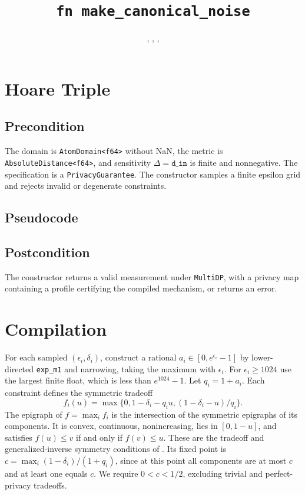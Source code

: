 \documentclass{article}
\title{\texttt{fn make\_canonical\_noise}}
\author{\AishwaryaRamasethuAuthor, \YuJuKuAuthor, \JordanAwanAuthor, \MichaelShoemateAuthor}
\begin{document}
\maketitle
\contrib

\section{Hoare Triple}
\subsection*{Precondition}
The domain is \texttt{AtomDomain<f64>} without NaN, the metric is
\texttt{AbsoluteDistance<f64>}, and sensitivity $\Delta=\texttt{d\_in}$
is finite and nonnegative. The specification is a \texttt{PrivacyGuarantee}.
The constructor samples a finite epsilon grid and rejects invalid or
degenerate constraints.

\subsection*{Pseudocode}


\subsection*{Postcondition}
\begin{theorem}
The constructor returns a valid measurement under \texttt{MultiDP}, with
a privacy map containing a profile certifying the compiled mechanism,
or returns an error.
\end{theorem}

\section{Compilation}
For each sampled $(\epsilon_i,\delta_i)$, construct a rational
$a_i\in[0,e^{\epsilon_i}-1]$ by lower-directed \texttt{exp\_m1} and
narrowing, taking the maximum with $\epsilon_i$. For $\epsilon_i\geq1024$
use the largest finite float, which is less than $e^{1024}-1$.
Let $q_i=1+a_i$. Each constraint defines the symmetric tradeoff
\[
 f_i(u)=\max\{0,1-\delta_i-q_i u,(1-\delta_i-u)/q_i\}.
\]
The epigraph of $f=\max_i f_i$ is the intersection of the symmetric
epigraphs of its components. It is convex, continuous, nonincreasing,
lies in $[0,1-u]$, and satisfies $f(u)\leq v$ if and only if
$f(v)\leq u$. These are the tradeoff and generalized-inverse symmetry
conditions of \cite{awan2023canonical}.
Its fixed point is $c=\max_i(1-\delta_i)/(1+q_i)$, since at this point all
components are at most $c$ and at least one equals $c$. We require
$0<c<1/2$, excluding trivial and perfect-privacy tradeoffs.
\end{document}
